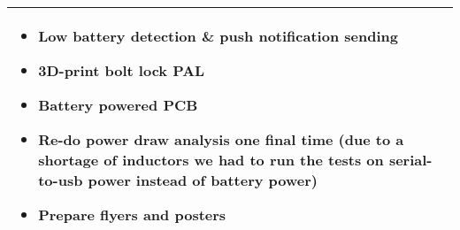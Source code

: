 \documentclass[a4paper]{article}
\newcommand{\colWidth}{141mm}
\begin{document}
\begin{center}
\begin{tabular}{|p{\colWidth}|}
{		\begin{itemize}
			\item Low battery detection \& push notification sending
			\item 3D-print bolt lock PAL
			\item Battery powered PCB
			\item Re-do power draw analysis one final time (due to a shortage of inductors we had to run the tests on serial-to-usb power instead of battery power)
			\item Prepare flyers and posters
		\end{itemize}
  }
  \\
  \hline
\end{tabular}

\end{center}
  
\end{document}
